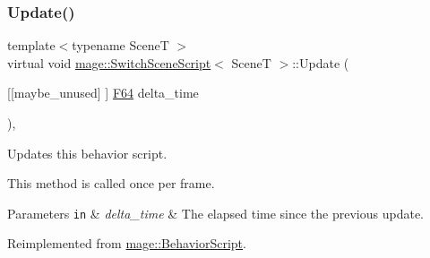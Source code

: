 \subsubsection{\texorpdfstring{Update()}{Update()}}
{\footnotesize\ttfamily template$<$typename SceneT $>$ \\
virtual void \hyperlink{classmage_1_1_switch_scene_script}{mage\+::\+Switch\+Scene\+Script}$<$ SceneT $>$\+::Update (\begin{DoxyParamCaption}\item[{\mbox{[}\mbox{[}maybe\+\_\+unused\mbox{]} \mbox{]} \hyperlink{namespacemage_ad26233bbec640deda836e572c1a23708}{F64}}]{delta\+\_\+time }\end{DoxyParamCaption})\hspace{0.3cm}{\ttfamily [override]}, {\ttfamily [virtual]}}

Updates this behavior script.

This method is called once per frame.


\begin{DoxyParams}[1]{Parameters}
\mbox{\tt in}  & {\em delta\+\_\+time} & The elapsed time since the previous update. \\
\hline
\end{DoxyParams}


Reimplemented from \hyperlink{classmage_1_1_behavior_script_afb9cf3759edf8876416d1df85489cba6}{mage\+::\+Behavior\+Script}.

